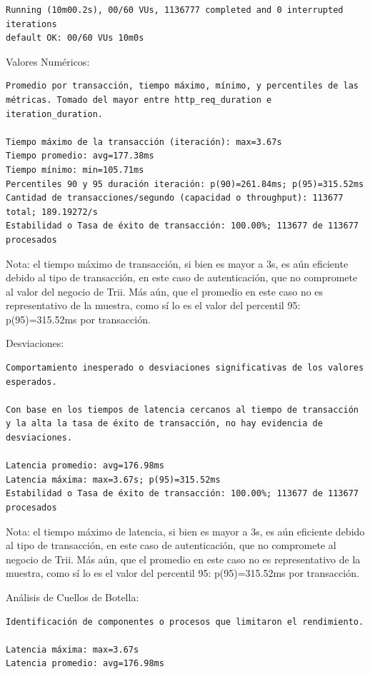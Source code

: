 \documentclass[
  paper=a4,
  ,captions=tableheading
]{scrartcl}
\begin{document}
\begin{verbatim}
Running (10m00.2s), 00/60 VUs, 1136777 completed and 0 interrupted iterations
default OK: 00/60 VUs 10m0s
\end{verbatim}

Valores Numéricos:

\begin{verbatim}
Promedio por transacción, tiempo máximo, mínimo, y percentiles de las métricas. Tomado del mayor entre http_req_duration e iteration_duration.

Tiempo máximo de la transacción (iteración): max=3.67s
Tiempo promedio: avg=177.38ms
Tiempo mínimo: min=105.71ms
Percentiles 90 y 95 duración iteración: p(90)=261.84ms; p(95)=315.52ms
Cantidad de transacciones/segundo (capacidad o throughput): 113677 total; 189.19272/s
Estabilidad o Tasa de éxito de transacción: 100.00%; 113677 de 113677 procesados
\end{verbatim}

Nota: el tiempo máximo de transacción, si bien es mayor a 3s, es aún
eficiente debido al tipo de transacción, en este caso de autenticación,
que no compromete al valor del negocio de Trii. Más aún, que el promedio
en este caso no es representativo de la muestra, como sí lo es el valor
del percentil 95: p(95)=315.52ms por transacción.

Desviaciones:

\begin{verbatim}
Comportamiento inesperado o desviaciones significativas de los valores esperados.

Con base en los tiempos de latencia cercanos al tiempo de transacción y la alta la tasa de éxito de transacción, no hay evidencia de desviaciones.

Latencia promedio: avg=176.98ms
Latencia máxima: max=3.67s; p(95)=315.52ms
Estabilidad o Tasa de éxito de transacción: 100.00%; 113677 de 113677 procesados
\end{verbatim}

Nota: el tiempo máximo de latencia, si bien es mayor a 3s, es aún
eficiente debido al tipo de transacción, en este caso de autenticación,
que no compromete al negocio de Trii. Más aún, que el promedio en este
caso no es representativo de la muestra, como sí lo es el valor del
percentil 95: p(95)=315.52ms por transacción.

Análisis de Cuellos de Botella:

\begin{verbatim}
Identificación de componentes o procesos que limitaron el rendimiento.

Latencia máxima: max=3.67s
Latencia promedio: avg=176.98ms
\end{verbatim}
\end{document}
